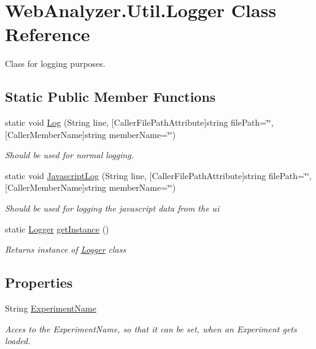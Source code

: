 \hypertarget{class_web_analyzer_1_1_util_1_1_logger}{}\section{Web\+Analyzer.\+Util.\+Logger Class Reference}
\label{class_web_analyzer_1_1_util_1_1_logger}


Class for logging purposes.  


\subsection*{Static Public Member Functions}
\begin{DoxyCompactItemize}
\item 
static void \hyperlink{class_web_analyzer_1_1_util_1_1_logger_aa10868b15bb58d0b47f87e20f3826af4}{Log} (String line, \mbox{[}Caller\+File\+Path\+Attribute\mbox{]}string file\+Path=\char`\"{}\char`\"{}, \mbox{[}Caller\+Member\+Name\mbox{]}string member\+Name=\char`\"{}\char`\"{})
\begin{DoxyCompactList}\small\item\em Should be used for normal logging. \end{DoxyCompactList}\item 
static void \hyperlink{class_web_analyzer_1_1_util_1_1_logger_a33483911cc1323468e23295904393b67}{Javascript\+Log} (String line, \mbox{[}Caller\+File\+Path\+Attribute\mbox{]}string file\+Path=\char`\"{}\char`\"{}, \mbox{[}Caller\+Member\+Name\mbox{]}string member\+Name=\char`\"{}\char`\"{})
\begin{DoxyCompactList}\small\item\em Should be used for logging the javascript data from the ui \end{DoxyCompactList}\item 
static \hyperlink{class_web_analyzer_1_1_util_1_1_logger}{Logger} \hyperlink{class_web_analyzer_1_1_util_1_1_logger_a9fe9027e12a767e6cd0c3b9cf798dc81}{get\+Instance} ()
\begin{DoxyCompactList}\small\item\em Returns instance of \hyperlink{class_web_analyzer_1_1_util_1_1_logger}{Logger} class \end{DoxyCompactList}\end{DoxyCompactItemize}
\subsection*{Properties}
\begin{DoxyCompactItemize}
\item 
String \hyperlink{class_web_analyzer_1_1_util_1_1_logger_ae0228bcd61648d9b38e8aceaaf97024a}{Experiment\+Name}
\begin{DoxyCompactList}\small\item\em Acces to the Experiment\+Name, so that it can be set, when an Experiment gets loaded. \end{DoxyCompactList}\end{DoxyCompactItemize}
